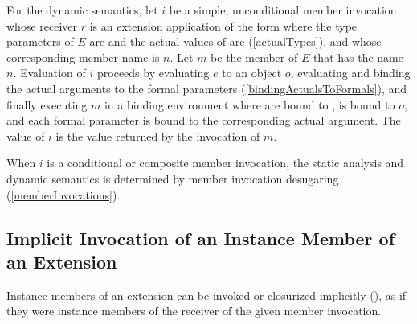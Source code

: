\documentclass[makeidx]{article}
\begin{document}

\LMHash{}%
%
For the dynamic semantics,
let $i$ be a simple, unconditional member invocation
whose receiver $r$ is an extension application of the form
%
where the type parameters of $E$ are 
and the actual values of  are 
(\ref{actualTypes}),
%
and whose corresponding member name is $n$.
Let $m$ be the member of $E$ that has the name $n$.
Evaluation of $i$ proceeds by evaluating
$e$ to an object $o$,
evaluating and binding the actual arguments to the formal parameters
(\ref{bindingActualsToFormals}),
and finally executing $m$
in a binding environment where  are bound to ,
\THIS{} is bound to $o$,
and each formal parameter is bound to the corresponding actual argument.
The value of $i$ is the value returned by the invocation of $m$.

\LMHash{}%
When $i$ is a conditional or composite member invocation,
the static analysis and dynamic semantics is determined by
member invocation desugaring
(\ref{memberInvocations}).



\subsection{Implicit Invocation of an Instance Member of an Extension}

\LMHash{}%
Instance members of an extension can be invoked or closurized implicitly
(),
as if they were instance members of the receiver of
the given member invocation.

\end{document}
